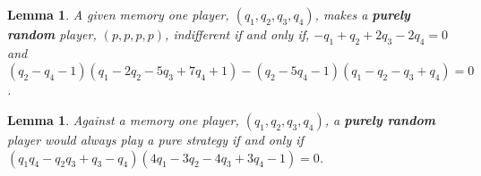 \documentclass[10pt]{article}
\newtheorem{lemma}[theorem]{Lemma}
\begin{document}
\begin{lemma}\label{lemma:constant}
    A given memory one player, \((q_1, q_2, q_3, q_4)\), makes a \textbf{purely
    random} player, \((p, p, p, p)\), indifferent if and only if, 
    \(-q_1 + q_2 + 2q_3 - 2q_4 = 0 \) and 
    \((q_2 - q_4 - 1)(q_1 - 2q_2 - 5q_3 + 7q_4 + 1) -(q_2 - 5q_4 - 1)(q_1 - q_2 - q_3 + q_4) = 0 \).
\end{lemma}

\begin{lemma}\label{lemma:linear}
    Against a memory one player, \((q_1, q_2, q_3, q_4)\), a \textbf{purely random}
    player would always play a pure strategy if and only if
    \((q_{1}q_{4} - q_{2} q_{3} + q_{3} - q_{4}) (4 q_{1} - 3 q_{2} - 4 q_{3} + 3 
    q_{4} - 1) = 0\).
\end{lemma}






\end{document}
